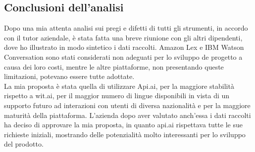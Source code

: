 \subsection{Conclusioni dell'analisi}
Dopo una mia attenta analisi sui pregi e difetti di tutti gli strumenti, in accordo con il tutor aziendale, è stata fatta una breve riunione con gli altri dipendenti, dove ho illustrato in modo sintetico i dati raccolti. Amazon Lex e IBM Watson Conversation sono stati considerati non adeguati per lo sviluppo de progetto a causa dei loro costi, mentre le altre piattaforme, non presentando queste limitazioni, potevano essere tutte adottate. \\
La mia proposta è stata quella di utilizzare Api.ai, per la maggiore stabilità rispetto a wit.ai, per il maggior numero di lingue disponibili in vista di un supporto futuro ad interazioni con utenti di diversa nazionalità e per la maggiore maturità della piattaforma. L'azienda dopo aver valutato anch'essa i dati raccolti ha deciso di approvare la mia proposta, in quanto api.ai rispettava tutte le sue richieste iniziali, mostrando delle potenzialità molto interessanti per lo sviluppo del prodotto.